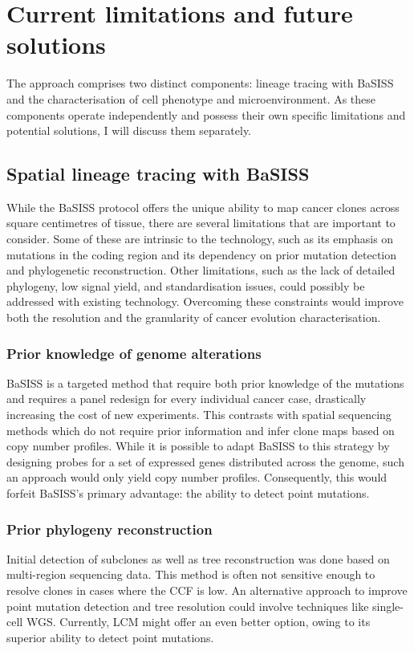 \section{Current limitations and future solutions}

The approach comprises two distinct components: lineage tracing with \ac{BaSISS} and the characterisation of cell phenotype and microenvironment. As these components operate independently and possess their own specific limitations and potential solutions, I will discuss them separately.

\subsection{Spatial lineage tracing with \acs{BaSISS}}

While the \ac{BaSISS} protocol offers the unique ability to map cancer clones across square centimetres of tissue, there are several limitations that are important to consider. Some of these are intrinsic to the technology, such as its emphasis on mutations in the coding region and its dependency on prior mutation detection and phylogenetic reconstruction. Other limitations, such as the lack of detailed phylogeny, low signal yield, and standardisation issues, could possibly be addressed with existing technology. Overcoming these constraints would improve both the resolution and the granularity of cancer evolution characterisation. 

\subsubsection*{Prior knowledge of genome alterations}

\ac{BaSISS} is a targeted method that require both prior knowledge of the mutations and requires a panel redesign for every individual cancer case, drastically increasing the cost of new experiments. This contrasts with spatial sequencing methods \parencite{Zhao2022-xd,Erickson2022-zh} which do not require prior information and infer clone maps based on copy number profiles. While it is possible to adapt \ac{BaSISS} to this strategy by designing probes for a set of expressed genes distributed across the genome, such an approach would only yield copy number profiles. Consequently, this would forfeit \ac{BaSISS}'s primary advantage: the ability to detect point mutations.

\subsubsection*{Prior phylogeny reconstruction}
Initial detection of subclones as well as tree reconstruction was done based on multi-region sequencing data. This method is often not sensitive enough to resolve clones in cases where the \ac{CCF} is low. An alternative approach to improve point mutation detection and tree resolution could involve techniques like single-cell \ac{WGS}. Currently, \ac{LCM} might offer an even better option, owing to its superior ability to detect point mutations.

